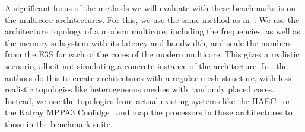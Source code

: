 A significant focus of the methods we will evaluate with these benchmarks is on the multicore architectures.
For this, we use the same method as in~\cite{weichslgartner2014daarm,schwarzer2017symmetry}.
We use the architecture topology of a modern multicore, including the frequencies, as well as the memory subsystem with its latency and bandwidth, and scale the numbers from the \ac{E3S} for each of the cores of the modern multicore.
This gives a realistic scenario, albeit not simulating a concrete instance of the architecture.
In~\cite{schwarzer2017symmetry} the authors do this to create architectures with a regular mesh structure, with less realistic topologies like heterogeneous meshes with randomly placed cores.
Instead, we use the topologies from actual existing systems like the HAEC~\cite{HAEC} or the Kalray MPPA3 Coolidge~\cite{coolidge} and map the processors in these architectures to those in the benchmark suite.